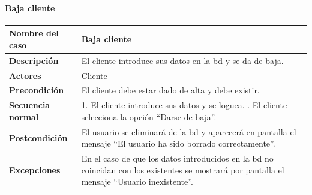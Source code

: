 \paragraph{Baja cliente}
\begin{table}[H]
	\centering
	\small
	\begin{tabularx}{0.8\textwidth}{|p{3.5cm}|X|}
		\hline
		\rowcolor{lightgray}
		\textbf{Nombre del caso}  & \textbf{Baja cliente}                                                                                                                                \\
		\hline
		\textbf{Descripción}      & El cliente introduce sus datos en la \gls{bd} y se da de baja.                                                                                       \\
		\hline
		\textbf{Actores}          & Cliente                                                                                                                                              \\
		\hline
		\textbf{Precondición}     & El cliente debe estar dado de alta y debe existir.                                                                                                   \\
		\hline
		\textbf{Secuencia normal} & 1. El cliente introduce sus datos y se loguea. \newline 2. El cliente selecciona la opción ``Darse de baja''.                                        \\
		\hline
		\textbf{Postcondición}    & El usuario se eliminará de la \gls{bd} y aparecerá en pantalla el mensaje ``El usuario ha sido borrado correctamente''.                              \\
		\hline
		\textbf{Excepciones}      & En el caso de que los datos introducidos en la \gls{bd} no coincidan con los existentes se mostrará por pantalla el mensaje ``Usuario inexistente''. \\
		\hline
	\end{tabularx}
\end{table}

